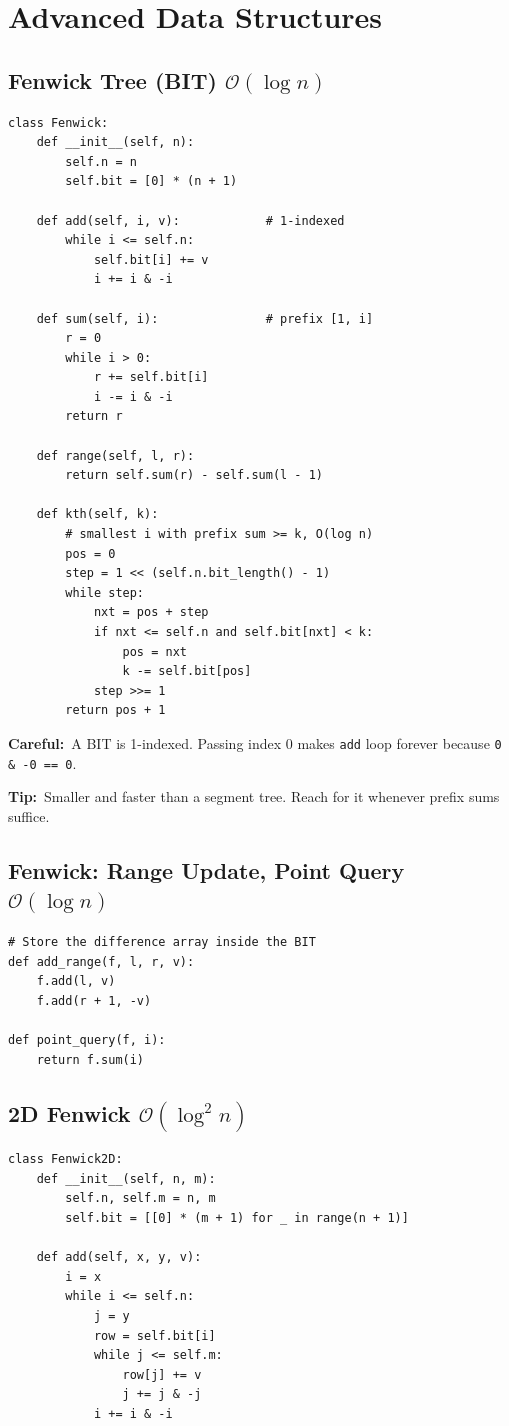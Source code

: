 \documentclass[10pt]{article}
\newcommand{\code}[1]{\texttt{\small #1}}
\newcommand{\sub}[2]{\subsection[#1]{#1\hspace{0.6em}%
  \textnormal{\color{accent2}\small$\mathcal{O}(#2)$}}}
\newcommand{\tip}[1]{{\color{tipc}\footnotesize\textbf{Tip:}}~{\footnotesize #1}\par}
\newcommand{\warn}[1]{{\color{warnc}\footnotesize\textbf{Careful:}}~{\footnotesize #1}\par}
\begin{document}
\section{Advanced Data Structures}
\begin{multicols}{2}

\sub{Fenwick Tree (BIT)}{\log n}
\begin{lstlisting}
class Fenwick:
    def __init__(self, n):
        self.n = n
        self.bit = [0] * (n + 1)

    def add(self, i, v):            # 1-indexed
        while i <= self.n:
            self.bit[i] += v
            i += i & -i

    def sum(self, i):               # prefix [1, i]
        r = 0
        while i > 0:
            r += self.bit[i]
            i -= i & -i
        return r

    def range(self, l, r):
        return self.sum(r) - self.sum(l - 1)

    def kth(self, k):
        # smallest i with prefix sum >= k, O(log n)
        pos = 0
        step = 1 << (self.n.bit_length() - 1)
        while step:
            nxt = pos + step
            if nxt <= self.n and self.bit[nxt] < k:
                pos = nxt
                k -= self.bit[pos]
            step >>= 1
        return pos + 1
\end{lstlisting}
\warn{A BIT is 1-indexed. Passing index 0 makes \code{add} loop forever
because \code{0 \& -0 == 0}.}
\tip{Smaller and faster than a segment tree. Reach for it whenever
prefix sums suffice.}

\sub{Fenwick: Range Update, Point Query}{\log n}
\begin{lstlisting}
# Store the difference array inside the BIT
def add_range(f, l, r, v):
    f.add(l, v)
    f.add(r + 1, -v)

def point_query(f, i):
    return f.sum(i)
\end{lstlisting}

\sub{2D Fenwick}{\log^2 n}
\begin{lstlisting}
class Fenwick2D:
    def __init__(self, n, m):
        self.n, self.m = n, m
        self.bit = [[0] * (m + 1) for _ in range(n + 1)]

    def add(self, x, y, v):
        i = x
        while i <= self.n:
            j = y
            row = self.bit[i]
            while j <= self.m:
                row[j] += v
                j += j & -j
            i += i & -i


\end{lstlisting}
\end{multicols}
\end{document}
